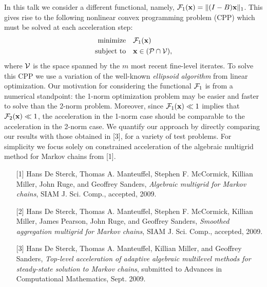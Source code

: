 \documentclass{report}
\begin{document}
In this talk we consider a different functional, namely, $\mathcal{F}_1({\bf x}) =
\|(I-B){\bf x}\|_1$. This gives rise to the following nonlinear convex
programming problem (CPP) which must be solved at each acceleration step:
\begin{align*}
\text{minimize} & \quad \mathcal{F}_1({\bf x})\\
\text{subject to} & \quad {\bf x} \in (\mathcal{P} \cap \mathcal{V}),
\end{align*}
where $\mathcal{V}$ is the space spanned by the $m$ most recent fine-level
iterates. To solve this CPP we use a variation of the well-known {\em
ellipsoid algorithm} from linear optimization. Our motivation for
considering the functional $\mathcal{F}_1$ is from a numerical standpoint: the
1-norm optimization problem may be easier and faster to solve than the
2-norm problem. Moreover, since $\mathcal{F}_1({\bf x}) \ll 1$ implies that
$\mathcal{F}_2({\bf x}) \ll 1$, the acceleration in the 1-norm case should be
comparable to the acceleration in the 2-norm case. We quantify our
approach by directly comparing our results with those obtained in [3],
for a variety of test problems. For simplicity we focus solely on
constrained acceleration of the algebraic multigrid method for Markov
chains from [1].

\vspace{1cm}

{}

\begin{enumerate}
\item[{[1]}] {\sc Hans De Sterck, Thomas A. Manteuffel, Stephen F.
McCormick, Killian Miller, John Ruge, and Geoffrey Sanders},
{\em Algebraic multigrid for Markov chains}, SIAM J. Sci. Comp., accepted, 2009.

\item[{[2]}] {\sc Hans De Sterck, Thomas A. Manteuffel, Stephen F.
McCormick, Killian Miller, James Pearson, John Ruge, and Geoffrey
Sanders}, {\em Smoothed aggregation multigrid for Markov chains}, SIAM J.
Sci. Comp., accepted, 2009.

\item[{[3]}] {\sc Hans De Sterck, Thomas A. Manteuffel, Killian Miller,
and Geoffrey Sanders},
{\em Top-level acceleration of adaptive algebraic multilevel methods for
steady-state solution to Markov
chains}, submitted to Advances in Computational Mathematics, Sept. 2009.
\end{enumerate}
\end{document}
